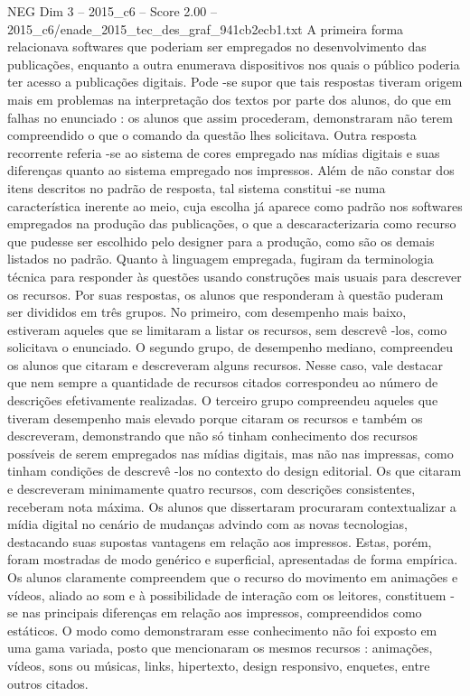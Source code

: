\begin{textsample}{NEG Dim 3 – 2015\_c6 – Score 2.00 – 2015\_c6/enade\_2015\_tec\_des\_graf\_941cb2ecb1.txt}
A primeira forma relacionava softwares que poderiam ser empregados no desenvolvimento das publicações, enquanto a outra enumerava dispositivos nos quais o público poderia ter acesso a publicações digitais.
Pode -se supor que tais respostas tiveram origem mais em problemas na interpretação dos textos por parte dos alunos, do que em falhas no enunciado : os alunos que assim procederam, demonstraram não terem compreendido o que o comando da questão lhes solicitava.
Outra resposta recorrente referia -se ao sistema de cores empregado nas mídias digitais e suas diferenças quanto ao sistema empregado nos impressos.
Além de não constar dos itens descritos no padrão de resposta, tal sistema constitui -se numa característica inerente ao meio, cuja escolha já aparece como padrão nos softwares empregados na produção das publicações, o que a descaracterizaria como recurso que pudesse ser escolhido pelo designer para a produção, como são os demais listados no padrão.
Quanto à linguagem empregada, fugiram da terminologia técnica para responder às questões usando construções mais usuais para descrever os recursos.
Por suas respostas, os alunos que responderam à questão puderam ser divididos em três grupos.
No primeiro, com desempenho mais baixo, estiveram aqueles que se limitaram a listar os recursos, sem descrevê -los, como solicitava o enunciado.
O segundo grupo, de desempenho mediano, compreendeu os alunos que citaram e descreveram alguns recursos.
Nesse caso, vale destacar que nem sempre a quantidade de recursos citados correspondeu ao número de descrições efetivamente realizadas.
O terceiro grupo compreendeu aqueles que tiveram desempenho mais elevado porque citaram os recursos e também os descreveram, demonstrando que não só tinham conhecimento dos recursos possíveis de serem empregados nas mídias digitais, mas não nas impressas, como tinham condições de descrevê -los no contexto do design editorial.
Os que citaram e descreveram minimamente quatro recursos, com descrições consistentes, receberam nota máxima.
Os alunos que dissertaram procuraram contextualizar a mídia digital no cenário de mudanças advindo com as novas tecnologias, destacando suas supostas vantagens em relação aos impressos.
Estas, porém, foram mostradas de modo genérico e superficial, apresentadas de forma empírica.
Os alunos claramente compreendem que o recurso do movimento em animações e vídeos, aliado ao som e à possibilidade de interação com os leitores, constituem -se nas principais diferenças em relação aos impressos, compreendidos como estáticos.
O modo como demonstraram esse conhecimento não foi exposto em uma gama variada, posto que mencionaram os mesmos recursos : animações, vídeos, sons ou músicas, links, hipertexto, design responsivo, enquetes, entre outros citados.

\end{textsample}
